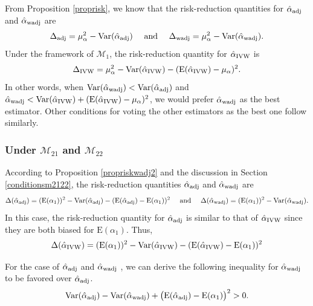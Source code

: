 \documentclass[11pt]{article}
\def\mrm#1{\mathrm{#1}} %
\def\mc#1{\mathcal{#1}} %
\def\E#1{\mathrm{E}(#1)} %
\def\var#1{\mathrm{Var}(#1)} %
\theoremstyle{definition}
\begin{document}
From Proposition \ref{proprisk}, we know that the risk-reduction quantities for $\hat{\alpha}_{\rm adj}$ and $\hat{\alpha}_{\rm wadj}$ are
\begin{align*}
  \Delta_{\rm adj} 
  = \mu_{\alpha}^2 -\var{\hat{\alpha}_{\rm adj}}
\quad   \text{ and } \quad 
  \Delta_{\rm wadj} 
  = \mu_{\alpha}^2-\var{\hat{\alpha}_{\rm wadj}}.
\end{align*}
Under the framework of $\mc{M}_1$, the risk-reduction quantity  for $\hat{\alpha}_{\rm IVW}$ is
\begin{align*}
  \Delta_{\rm IVW} = \mu_{\alpha}^2- \var{\hat{\alpha}_{\rm IVW}} -(\E{\hat{\alpha}_{\rm IVW}}-\mu_{\alpha})^2.
\end{align*}
In other words, when $\var{\hat{\alpha}_{\rm wadj}}<\var{\hat{\alpha}_{\rm adj}}$ and $\hat{\alpha}_{\rm wadj} < \var{\hat{\alpha}_{\rm IVW}} +(\E{\hat{\alpha}_{\rm IVW}}-\mu_{\alpha})^2$, we would prefer $\hat{\alpha}_{\rm wadj}$ as the best estimator. Other conditions for voting the other estimators as the best one follow similarly. 

\subsubsection{Under $\mc{M}_{21}$ and $\mc{M}_{22}$}
\label{section322}
According to Proposition \ref{propriskwadj2} and the discussion in Section \ref{conditionsm2122}, the risk-reduction quantities $\hat{\alpha}_{\rm adj}$ and $\hat{\alpha}_{\rm wadj}$ are
\begin{align*}
  \Delta(\hat{\alpha}_{\rm adj})
  = (\E{\alpha_1})^2 -\var{\hat{\alpha}_{\rm adj}} -(\E{\hat{\alpha}_{\rm adj}}-\E{\alpha_1})^2
\quad   \text{ and } \quad 
  \Delta(\hat{\alpha}_{\rm wadj})
  = (\E{\alpha_1})^2-\var{\hat{\alpha}_{\rm wadj}}.
\end{align*}
In this case, the risk-reduction quantity for $\hat{\alpha}_{\rm adj}$ is similar to that of $\hat{\alpha}_{\rm IVW}$ since they are both biased for $\E{\alpha_1}$.  Thus,
\begin{align*}
 \Delta(\hat{\alpha}_{\rm IVW})
  = (\E{\alpha_1})^2 -\var{\hat{\alpha}_{\rm IVW}} -(\E{\hat{\alpha}_{\rm IVW}}-\E{\alpha_1})^2
\end{align*}



For the case of $\hat{\alpha}_{\rm adj}$ and $\hat{\alpha}_{\rm wadj}$ , we can derive the following inequality for $\hat{\alpha}_{\rm wadj}$ to be favored over $\hat{\alpha}_{\rm adj}$.
 \begin{align*}
  \var{\hat{\alpha}_{\rm adj}} 
  -\var{\hat{\alpha}_{\rm wadj}} + \big(\E{\hat{\alpha}_{\rm adj}}-\mrm{E}(\alpha_1)\big)^2> 0.
\end{align*}
 
\end{document}
